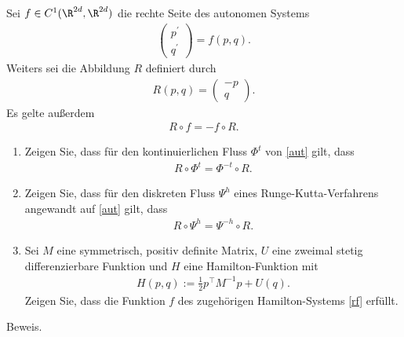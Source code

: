\begin{exercise}
  Sei $f \in C^1(\R^{2d},\R^{2d})$ die rechte Seite des autonomen Systems
  \begin{align}\label{aut}
    \begin{pmatrix}
      p^{\prime} \\ q^{\prime}
    \end{pmatrix} = f(p,q).
  \end{align}
  Weiters sei die Abbildung $R$ definiert durch
  \begin{align}
    R(p,q) = \begin{pmatrix}
      -p \\ q
    \end{pmatrix}.
  \end{align}
  Es gelte außerdem
  \begin{align}\label{rf}
    R \circ f = -f \circ R.
  \end{align}
  \begin{enumerate}[label = \textbf{\alph*)}]
    \item Zeigen Sie, dass für den kontinuierlichen Fluss $\Phi^t$ von \eqref{aut}
    gilt, dass
    \begin{align*}
      R \circ \Phi^t = \Phi^{-t} \circ R.
    \end{align*}
    \item Zeigen Sie, dass für den diskreten Fluss $\Psi^h$ eines Runge-Kutta-Verfahrens angewandt auf \eqref{aut} gilt, dass
    \begin{align*}
      R \circ \Psi^h = \Psi^{-h} \circ R.
    \end{align*}
    \item Sei $M$ eine symmetrisch, positiv definite Matrix, $U$ eine zweimal
    stetig differenzierbare Funktion und $H$ eine Hamilton-Funktion mit
    \begin{align*}
      H(p,q) := \frac{1}{2}p^{\top}M^{-1}p + U(q).
    \end{align*}
    Zeigen Sie, dass die Funktion $f$ des zugehörigen Hamilton-Systems \eqref{rf}
    erfüllt.
  \end{enumerate}
\end{exercise}

\begin{solution}
  Beweis.
\end{solution}

